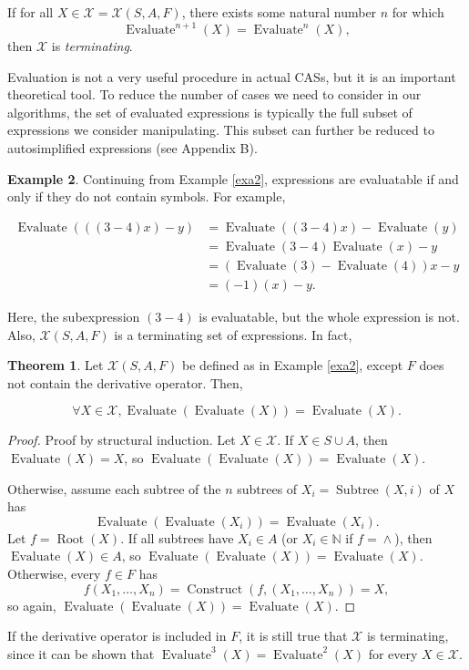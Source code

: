 \documentclass{article}
\theoremstyle{definition}
\newtheorem{thm}{Theorem}[section]
\newtheorem{exa}[thm]{Example}
\DeclareMathOperator{\pow}{\wedge}
\DeclareMathOperator{\construct}{Construct}
\DeclareMathOperator{\Root}{Root}
\DeclareMathOperator{\subtree}{Subtree}
\DeclareMathOperator{\eval}{Evaluate}
\begin{document}
If for all $X \in \mathcal{X} = \mathcal{X}(S, A, F)$, there exists some natural number $n$ for which \[\eval^{n+1}(X) = \eval^n(X),\] then $\mathcal{X}$ is \emph{terminating}.
    
Evaluation is not a very useful procedure in actual CASs, but it is an important theoretical tool. To reduce the number of cases we need to consider in our algorithms, the set of evaluated expressions is typically the full subset of expressions we consider manipulating. This subset can further be reduced to autosimplified expressions (see Appendix B).

\begin{exa} Continuing from Example \ref{exa2}, expressions are evaluatable if and only if they do not contain symbols. For example,

\begin{align*}
    \eval(((3 - 4)x) - y) &= \eval((3-4)x)-\eval(y)\\
                        &= \eval(3-4)\eval(x) - y \\
                        &= (\eval(3)-\eval(4))x-y\\
                        &= (-1)(x)-y.
\end{align*}

Here, the subexpression $(3-4)$ is evaluatable, but the whole expression is not. Also, $\mathcal{X}(S, A, F)$ is a terminating set of expressions. In fact,

\begin{thm}
    Let $\mathcal{X}(S, A, F)$ be defined as in Example \ref{exa2}, except $F$ does not contain the derivative operator. Then, 
    
    \begin{equation*}
            \forall X \in \mathcal{X}, \eval(\eval(X)) = \eval(X).
    \end{equation*}

\end{thm}
\begin{proof}
    Proof by structural induction. Let $X \in \mathcal{X}$. If $X \in S \cup A$, then $\eval(X) = X$, so $\eval(\eval(X)) = \eval(X)$.
    
    Otherwise, assume each subtree of the $n$ subtrees of $X_i = \subtree(X, i)$ of $X$ has \[\eval(\eval(X_i)) = \eval(X_i).\] Let $f = \Root(X)$. If all subtrees have $X_i \in A$ (or $X_i \in \mathbb{N}$ if $f = \pow$), then $\eval(X) \in A$, so $\eval(\eval(X)) = \eval(X)$. Otherwise, every $f \in F$ has
    \begin{equation*}
            f(X_1, \ldots ,X_n) = \construct(f, (X_1, \ldots, X_n)) = X,
    \end{equation*}
    so again, $\eval(\eval(X)) = \eval(X)$.
\end{proof}

If the derivative operator is included in $F$, it is still true that $\mathcal{X}$ is terminating, since it can be shown that $\eval^3(X) = \eval^2(X)$ for every $X \in \mathcal{X}$.
    
\end{exa}
\end{document}
